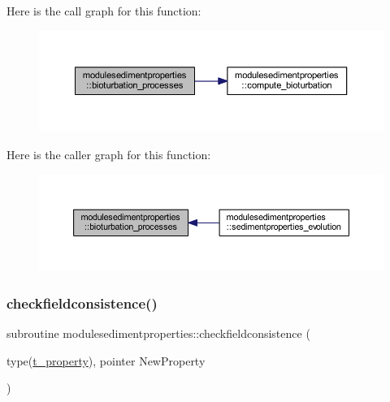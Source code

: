 Here is the call graph for this function\+:\nopagebreak
\begin{figure}[H]
\begin{center}
\leavevmode
\includegraphics[width=350pt]{namespacemodulesedimentproperties_a1d7c298cf760f1e569bc908fe283cb62_cgraph}
\end{center}
\end{figure}
Here is the caller graph for this function\+:\nopagebreak
\begin{figure}[H]
\begin{center}
\leavevmode
\includegraphics[width=350pt]{namespacemodulesedimentproperties_a1d7c298cf760f1e569bc908fe283cb62_icgraph}
\end{center}
\end{figure}
\mbox{\label{namespacemodulesedimentproperties_aed9da5330d31cd4f61d7b60492c4d0ad}} 
\subsubsection{\texorpdfstring{checkfieldconsistence()}{checkfieldconsistence()}}
{\footnotesize\ttfamily subroutine modulesedimentproperties\+::checkfieldconsistence (\begin{DoxyParamCaption}\item[{type(\mbox{\hyperlink{structmodulesedimentproperties_1_1t__property}{t\+\_\+property}}), pointer}]{New\+Property }\end{DoxyParamCaption})\hspace{0.3cm}{\ttfamily [private]}}

